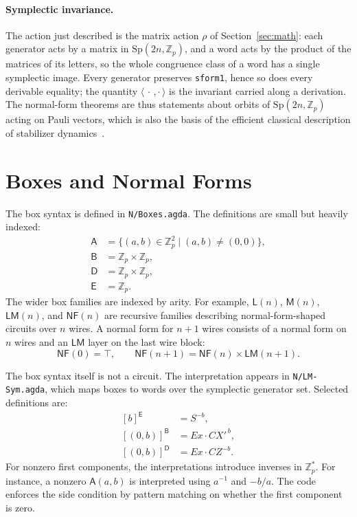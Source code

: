 \documentclass[sigplan,screen,review,anonymous]{acmart}
\newcommand{\Zp}{\mathbb{Z}_p}
\newcommand{\NF}{\mathsf{NF}}
\newcommand{\LM}{\mathsf{LM}}
\newcommand{\ABox}{\mathsf{A}}
\newcommand{\BBox}{\mathsf{B}}
\newcommand{\DBox}{\mathsf{D}}
\newcommand{\EBox}{\mathsf{E}}
\newcommand{\LBox}{\mathsf{L}}
\newcommand{\MBox}{\mathsf{M}}
\newcommand{\file}[1]{\texttt{#1}}
\newcommand{\Sp}{\mathrm{Sp}}
\begin{document}
\paragraph{Symplectic invariance.}
The action just described is the matrix action \(\rho\) of
Section~\ref{sec:math}: each generator acts by a matrix in
\(\Sp(2n,\Zp)\), and a word acts by the product of the matrices of its
letters, so the whole congruence class of a word has a single symplectic
image.  Every generator preserves \texttt{sform1}, hence so does every
derivable equality; the quantity \(\langle\,\cdot\,,\cdot\,\rangle\) is
the invariant carried along a derivation.  The normal-form theorems are
thus statements about orbits of \(\Sp(2n,\Zp)\) acting on Pauli vectors,
which is also the basis of the efficient classical description of
stabilizer dynamics~\cite{Aaronson2004,deBeaudrap2013}.

\section{Boxes and Normal Forms}

The box syntax is defined in \file{N/Boxes.agda}.  The definitions are
small but heavily indexed:
\[
\begin{aligned}
\ABox &= \{(a,b) \in \Zp^2 \mid (a,b) \ne (0,0)\},\\
\BBox &= \Zp \times \Zp,\\
\DBox &= \Zp \times \Zp,\\
\EBox &= \Zp.
\end{aligned}
\]
The wider box families are indexed by arity.  For example,
\(\LBox(n)\), \(\MBox(n)\), \(\LM(n)\), and \(\NF(n)\) are recursive
families describing normal-form-shaped circuits over \(n\) wires.  A
normal form for \(n+1\) wires consists of a normal form on \(n\) wires
and an \(\LM\) layer on the last wire block:
\[
  \NF(0) = \top,\qquad
  \NF(n+1) = \NF(n) \times \LM(n+1).
\]

The box syntax itself is not a circuit.  The interpretation appears
in \file{N/LM-Sym.agda}, which maps boxes to words over the
symplectic generator set.  Selected definitions are:
\[
\begin{aligned}
[b]^\EBox &= S^{-b},\\
[(0,b)]^\BBox &= Ex \cdot CX'^{\,b},\\
[(0,b)]^\DBox &= Ex \cdot CZ^{-b}.
\end{aligned}
\]
For nonzero first components, the interpretations introduce inverses
in \(\Zp^\ast\).  For instance, a nonzero \(\ABox(a,b)\) is
interpreted using \(a^{-1}\) and \(-b/a\).  The code enforces the
side condition by pattern matching on whether the first component is
zero.
\end{document}
